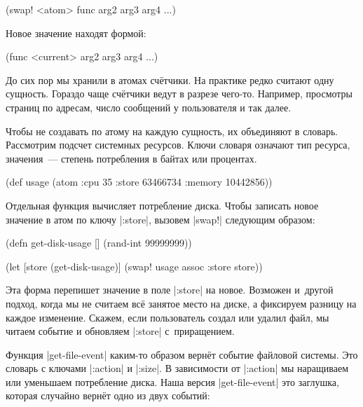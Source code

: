 \begin{english}
  \begin{clojure}
(swap! <atom> func arg2 arg3 arg4 ...)
  \end{clojure}
\end{english}

\noindent
Новое значение находят формой:

\begin{english}
  \begin{clojure}
(func <current> arg2 arg3 arg4 ...)
  \end{clojure}
\end{english}

До сих пор мы хранили в атомах сч\"{е}тчики. На практике редко считают одну
сущность. Гораздо чаще сч\"{е}тчики ведут в разрезе чего-то. Например, просмотры
страниц по адресам, число сообщений у пользователя и так далее.

Чтобы не создавать по атому на каждую сущность, их объединяют в
словарь. Рассмотрим подсчет системных ресурсов. Ключи словаря означают тип
ресурса, значения~--- степень потребления в байтах или процентах.

\begin{english}
  \begin{clojure}
(def usage
  (atom {:cpu 35
         :store 63466734
         :memory 10442856}))
  \end{clojure}
\end{english}

Отдельная функция вычисляет потребление диска. Чтобы записать новое значение в
атом по ключу \spverb|:store|, вызовем \spverb|swap!| следующим образом:

\begin{english}
  \begin{clojure}
(defn get-disk-usage []
  (rand-int 99999999))

(let [store (get-disk-usage)]
  (swap! usage assoc :store store))
  \end{clojure}
\end{english}

Эта форма перепишет значение в поле \spverb|:store| на новое. Возможен и~другой
подход, когда мы не считаем всё занятое место на диске, а фиксируем разницу на
каждое изменение. Скажем, если пользователь создал или удалил файл, мы читаем
событие и обновляем \spverb|:store| с~приращением.

Функция \spverb|get-file-event| каким-то образом верн\"{е}т событие файловой
системы. Это словарь с ключами \spverb|:action| и \spverb|:size|. В зависимости
от \spverb|:action| мы наращиваем или уменьшаем потребление диска. Наша версия
\spverb|get-file-event| это заглушка, которая случайно верн\"{е}т одно из двух
событий:

